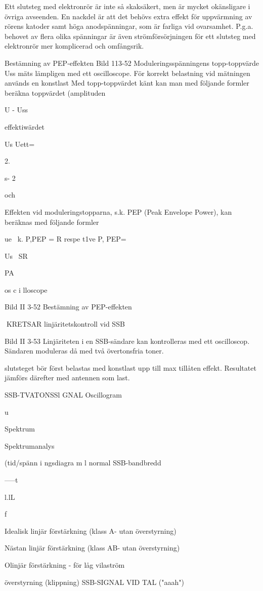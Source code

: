 \documentclass[a4paper,twoside,twocolumn,openright]{book}
\begin{document}
{{{{{{Ett slutsteg med elektronrör är inte så
skaksäkert, men är mycket okänsligare i
övriga avseenden. En nackdel är att det
behövs extra effekt för uppvärmning av rörens katoder samt höga anodspänningar,
som är farliga vid ovarsamhet. P.g.a. behovet av flera olika spänningar är även strömförsörjningen för ett slutsteg med elektronrör
mer komplicerad och omfångsrik.

Bestämning av PEP-effekten
Bild 113-52
Moduleringsspänningens topp-toppvärde
Uss mäts lämpligen med ett oscilloscope.
För korrekt belastning vid mätningen används en konstlast
Med topp-toppvärdet känt kan man med
följande formler beräkna
toppvärdet (amplituden

U - Uss

effektiwärdet

Us
Uett= {2.

s- 2

och

Effekten vid moduleringstopparna, s.k.
PEP (Peak Envelope Power), kan beräknas
med följande formler

ue~
k.
P,PEP =
R respe t1ve
P,
PEP=

Us~
SR

PA

os c i lloscope

Bild II 3-52 Bestämning av PEP-effekten

KRETSAR
linjäritetskontroll vid SSB

Bild II 3-53
Linjäriteten i en SSB-sändare kan kontrolleras med ett oscilloscop. Sändaren moduleras då med två övertonsfria toner.

slutsteget bör först belastas med konstlast
upp till max tillåten effekt. Resultatet jämförs
därefter med antennen som last.

SSB-TVATONSSl GNAL
Oscillogram

u

Spektrum

Spektrumanalys

(tid/spänn i ngsdiagra m l
normal SSB-bandbredd

-----t

l.lL 

f

Idealisk linjär förstärkning (klass A- utan överstyrning)

Nästan linjär förstärkning (klass AB- utan överstyrning)

Olinjär förstärkning - för låg vilaström

överstyrning (klippning)
SSB-SIGNAL VID TAL ("aaah")

}}}}}}}
\end{document}
